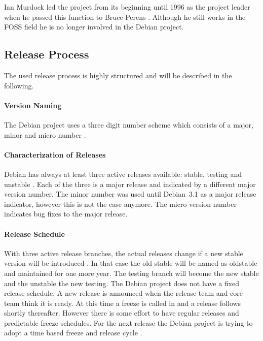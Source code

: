 Ian Murdock led the project from its beginning until 1996 as the project
leader when he passed this function to Bruce Perens
\cite{DebianFAQ,DebianHistory}. Although he still works in the \ac{FOSS} field
he is no longer involved in the Debian project.

\subsection{Release Process}

The used release process is highly structured and will be described in the
following.

\paragraph{Version Naming}

The Debian project uses a three digit number scheme which consists of a major,
minor and micro number \cite{DebianReleases}.

\paragraph{Characterization of Releases}

Debian has always at least three active releases available: stable, testing and
unstable \cite{DebianReleases,DebianReleaseManagement}. Each of the three is a
major release and indicated by a different major version number. The minor
number was used until Debian~3.1 as a major release indicator, however this is
not the case anymore. The micro version number indicates bug fixes to the major
release.

\paragraph{Release Schedule}

With three active release branches, the actual releases change if a new stable
version will be introduced
\cite{McGovern2011,DebianReleaseManagement,DebianReleaseGoals}. In that case
the old stable will be named as oldstable and maintained for one more year. The
testing branch will become the new stable and the unstable the new testing. The
Debian project does not have a fixed release schedule. A new release is
announced when the release team and core team think it is ready. At this time a
freeze is called in and a release follows shortly thereafter. However there is
some effort to have regular releases and predictable freeze schedules. For the
next release the Debian project is trying to adopt a time based freeze and
release cycle \cite{McGovern2011}.

